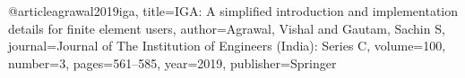 @article{agrawal2019iga,
  title={IGA: A simplified introduction and implementation details for finite element users},
  author={Agrawal, Vishal and Gautam, Sachin S},
  journal={Journal of The Institution of Engineers (India): Series C},
  volume={100},
  number={3},
  pages={561--585},
  year={2019},
  publisher={Springer}
}
